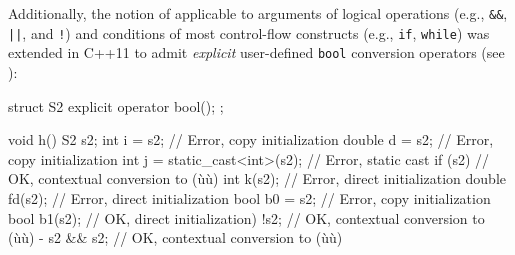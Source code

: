 \noindent Additionally, the notion of  
applicable to arguments of logical operations
(e.g., \lstinline!&&!, \lstinline!||!, and \lstinline|!|) and conditions of
most control-flow constructs (e.g., \lstinline!if!, \lstinline!while!) was
extended in C++11 to admit \emph{explicit} user-defined \lstinline!bool!
conversion operators (see ):

\begin{emcppslisting}
struct S2 { explicit operator bool(); };

void h()
{
    S2 s2;
    int i = s2;                    // Error, copy initialization
    double d = s2;                 // Error, copy initialization
    int j = static_cast<int>(s2);  // Error, static cast
    if (s2) { }                    // OK, contextual conversion to (ù{}ù)
    int k(s2);                     // Error, direct initialization
    double fd(s2);                 // Error, direct initialization
    bool b0 = s2;                  // Error, copy initialization
    bool b1(s2);                   // OK, direct initialization)                                     
    !s2;                           // OK, contextual conversion to (ù{}ù)                                               -
    s2 && s2;                      // OK, contextual conversion to (ù{}ù)
}
\end{emcppslisting}
    
